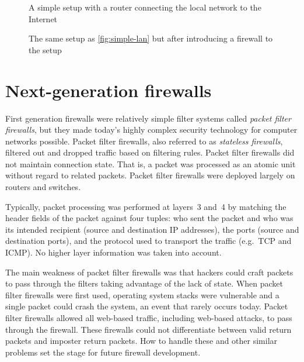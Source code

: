 \begin{figure}
\begin{minipage}[b]{.47\textwidth}

\caption{A simple setup with a router connecting the local network to the Internet}
\label{fig:simple-lan}
\end{minipage}
\hfill
\begin{minipage}[b]{.47\textwidth}

\caption{The same setup as \cref{fig:simple-lan} but after introducing a firewall to the setup}
\label{fig:simple-lan-fw}
\end{minipage}
\end{figure}


\section{Next-generation firewalls}
\label{sec:intro-ngfw}


First generation firewalls were relatively simple filter systems called \emph{packet filter firewalls}, but they made today's highly complex security technology for computer networks possible.
Packet filter firewalls, also referred to as \emph{stateless firewalls}, filtered out and dropped traffic based on filtering rules.
Packet filter firewalls did not maintain connection state.
That is, a packet was processed as an atomic unit without regard to related packets.
Packet filter firewalls were deployed largely on routers and switches.

Typically, packet processing was performed at layers~3 and~4 by matching the header fields of the packet against four tuples: who sent the packet and who was its intended recipient (source and destination IP addresses), the ports (source and destination ports), and the protocol used to transport the traffic (e.g.~TCP and ICMP).
No higher layer information was taken into account.

The main weakness of packet filter firewalls was that hackers could craft packets to pass through the filters taking advantage of the lack of state.
When packet filter firewalls were first used, operating system stacks were vulnerable and a single packet could crash the system, an event that rarely occurs today.
Packet filter firewalls allowed all web-based traffic, including web-based attacks, to pass through the firewall.
These firewalls could not differentiate between valid return packets and imposter return packets.
How to handle these and other similar problems set the stage for future firewall development.

